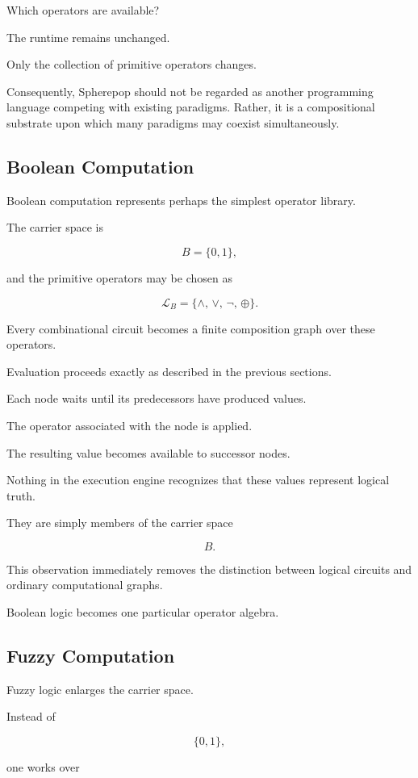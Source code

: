 \documentclass[12pt,oneside]{article}
\begin{document}
Which operators are available?

The runtime remains unchanged.

Only the collection of primitive operators changes.

Consequently, Spherepop should not be regarded as another programming language competing with existing paradigms. Rather, it is a compositional substrate upon which many paradigms may coexist simultaneously.

\subsection{Boolean Computation}

Boolean computation represents perhaps the simplest operator library.

The carrier space is

\[
B=\{0,1\},
\]

and the primitive operators may be chosen as

\[
\mathcal L_B=
\{
\land,\,
\lor,\,
\lnot,\,
\oplus
\}.
\]

Every combinational circuit becomes a finite composition graph over these operators.

Evaluation proceeds exactly as described in the previous sections.

Each node waits until its predecessors have produced values.

The operator associated with the node is applied.

The resulting value becomes available to successor nodes.

Nothing in the execution engine recognizes that these values represent logical truth.

They are simply members of the carrier space

\[
B.
\]

This observation immediately removes the distinction between logical circuits and ordinary computational graphs.

Boolean logic becomes one particular operator algebra.

\subsection{Fuzzy Computation}

Fuzzy logic enlarges the carrier space.

Instead of

\[
\{0,1\},
\]

one works over
\end{document}
